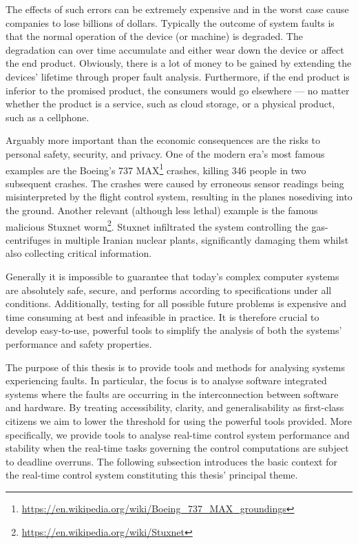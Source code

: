 The effects of such errors can be extremely expensive and in the worst case cause companies to lose billions of dollars.
Typically the outcome of system faults is that the normal operation of the device (or machine) is degraded.
The degradation can over time accumulate and either wear down the device or affect the end product.
Obviously, there is a lot of money to be gained by extending the devices' lifetime through proper fault analysis.
Furthermore, if the end product is inferior to the promised product, the consumers would go elsewhere --- no matter whether the product is a service, such as cloud storage, or a physical product, such as a cellphone.

Arguably more important than the economic consequences are the risks to personal safety, security, and privacy.
One of the modern era's most famous examples are the Boeing's 737 MAX\footnote{\url{https://en.wikipedia.org/wiki/Boeing_737_MAX_groundings}} crashes, killing 346 people in two subsequent crashes.
The crashes were caused by erroneous sensor readings being misinterpreted by the flight control system, resulting in the planes nosediving into the ground.
Another relevant (although less lethal) example is the famous malicious Stuxnet worm\footnote{\url{https://en.wikipedia.org/wiki/Stuxnet}}.
Stuxnet infiltrated the system controlling the gas-centrifuges in multiple Iranian nuclear plants, significantly damaging them whilst also collecting critical information. 

Generally it is impossible to guarantee that today's complex computer systems are absolutely safe, secure, and performs according to specifications under all conditions.
Additionally, testing for all possible future problems is expensive and time consuming at best and infeasible in practice.
It is therefore crucial to develop easy-to-use, powerful tools to simplify the analysis of both the systems' performance and safety properties.

The purpose of this thesis is to provide tools and methods for analysing systems experiencing faults.
In particular, the focus is to analyse software integrated systems where the faults are occurring in the interconnection between software and hardware.
By treating accessibility, clarity, and generalisability as first-class citizens we aim to lower the threshold for using the powerful tools provided.
More specifically, we provide tools to analyse real-time control system performance and stability when the real-time tasks governing the control computations are subject to deadline overruns.
The following subsection introduces the basic context for the real-time control system constituting this thesis' principal theme.

